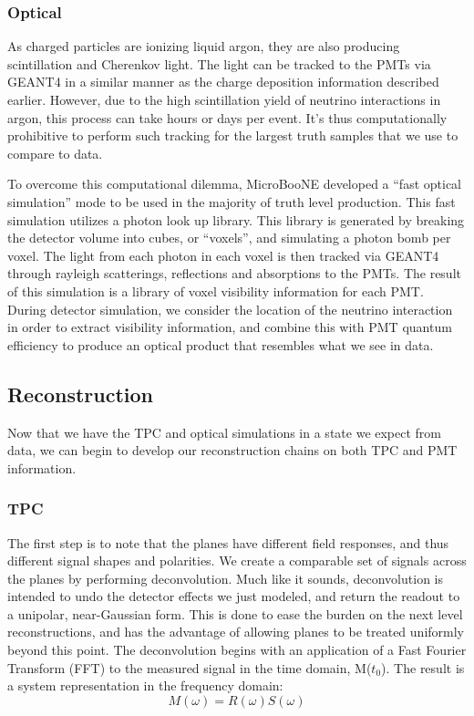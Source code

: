 \subsubsection{Optical}
As charged particles are ionizing liquid argon, they are also producing scintillation and Cherenkov light. The light can be  tracked to the PMTs via GEANT4 in a similar manner as the charge deposition information described earlier. However, due to the high scintillation yield of neutrino interactions in argon, this process can take hours or days per event. It's thus computationally prohibitive to perform such tracking for the largest truth samples that we use to compare to data.  
\par To overcome this computational dilemma, MicroBooNE developed a “fast optical simulation” mode to be used in the majority of truth level production.  This fast simulation utilizes a photon look up library. This library is generated by breaking the detector volume into cubes, or ``voxels'', and simulating a photon bomb per voxel.  The light from each photon in each voxel is then tracked via GEANT4 through rayleigh scatterings, reflections and absorptions to the PMTs. The result of this simulation is a library of voxel visibility information for each PMT.  During detector simulation, we consider the location of the neutrino interaction in order to extract visibility information, and combine this with PMT quantum efficiency to produce an optical product that resembles what we see in data.  
 
\subsection{Reconstruction}
\label{sec:reco}
Now that we have the TPC and optical simulations in a state we expect from data, we can begin to develop our reconstruction chains on both TPC and PMT information. 
\subsubsection{TPC}
 The first step is to note that the planes have different field responses, and thus different signal shapes and polarities.  We create a comparable set of signals across the planes by performing deconvolution.  Much like it sounds, deconvolution is intended to undo the detector effects we just modeled, and return the readout to a unipolar, near-Gaussian form. This is done to ease the burden on the next level reconstructions, and has the advantage of allowing planes to be treated uniformly beyond this point. The deconvolution begins with an application of a Fast Fourier Transform (FFT) to the measured signal in the time domain, M($t_0$). The result is a system representation in the frequency domain:
\begin{equation}
M(\omega) = R(\omega)S(\omega) 
\end{equation}

